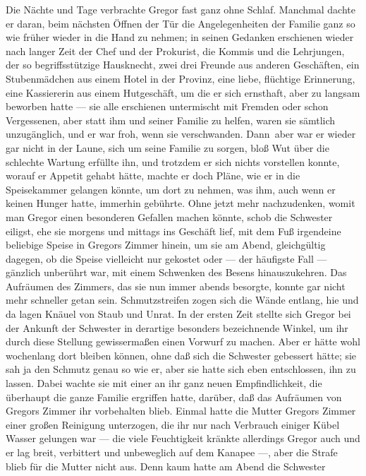Die Nächte und Tage verbrachte Gregor fast ganz ohne Schlaf. Manchmal
dachte er daran, beim nächsten Öffnen der Tür die Angelegenheiten der
Familie ganz so wie früher wieder in die Hand zu nehmen; in seinen
Gedanken erschienen wieder nach langer Zeit der Chef und der Prokurist,
die Kommis und die Lehrjungen, der so begriffsstützige Hausknecht, zwei
drei Freunde aus anderen Geschäften, ein Stubenmädchen aus einem Hotel
in der Provinz, eine liebe, flüchtige Erinnerung, eine Kassiererin aus
einem Hutgeschäft, um die er sich ernsthaft, aber zu langsam beworben
hatte --- sie alle erschienen untermischt mit Fremden oder schon
Vergessenen, aber statt ihm und seiner Familie zu helfen, waren sie
sämtlich unzugänglich, und er war froh, wenn sie verschwanden. Dann\est\ aber
war er wieder gar nicht in der Laune, sich um seine Familie zu sorgen,
bloß Wut über die schlechte Wartung erfüllte ihn, und trotzdem er sich
nichts vorstellen konnte, worauf er Appetit gehabt hätte, machte er doch
Pläne, wie er in die Speisekammer gelangen könnte, um dort zu nehmen,
was ihm, auch wenn er keinen Hunger hatte, immerhin gebührte. Ohne jetzt
mehr nachzudenken, womit man Gregor einen besonderen Gefallen machen
könnte, schob die Schwester eiligst, ehe sie morgens und mittags ins
Geschäft lief, mit dem Fuß irgendeine beliebige Speise in Gregors Zimmer
hinein, um sie am Abend, gleichgültig dagegen, ob die Speise vielleicht
nur gekostet oder --- der häufigste Fall --- gänzlich unberührt war, mit
einem Schwenken des Besens hinauszukehren. Das Aufräumen des Zimmers,
das sie nun immer abends besorgte, konnte gar nicht mehr schneller getan
sein. Schmutzstreifen zogen sich die Wände entlang, hie und da lagen
Knäuel von Staub und Unrat. In der ersten Zeit stellte sich Gregor bei
der Ankunft der Schwester in derartige besonders bezeichnende Winkel, um
ihr durch diese Stellung gewissermaßen einen Vorwurf zu machen. Aber er
hätte wohl wochenlang dort bleiben können, ohne daß sich die Schwester
gebessert hätte; sie sah ja den Schmutz genau so wie er, aber sie hatte
sich eben entschlossen, ihn zu lassen. Dabei wachte sie mit einer an ihr
ganz neuen Empfindlichkeit, die überhaupt die ganze Familie ergriffen
hatte, darüber, daß das Aufräumen von Gregors Zimmer ihr vorbehalten
blieb. Einmal hatte die Mutter Gregors Zimmer einer großen Reinigung
unterzogen, die ihr nur nach Verbrauch einiger Kübel Wasser gelungen war
--- die viele Feuchtigkeit kränkte allerdings Gregor auch und er lag
breit, verbittert und unbeweglich auf dem Kanapee ---, aber die Strafe
blieb für die Mutter nicht aus. Denn kaum hatte am Abend die Schwester
